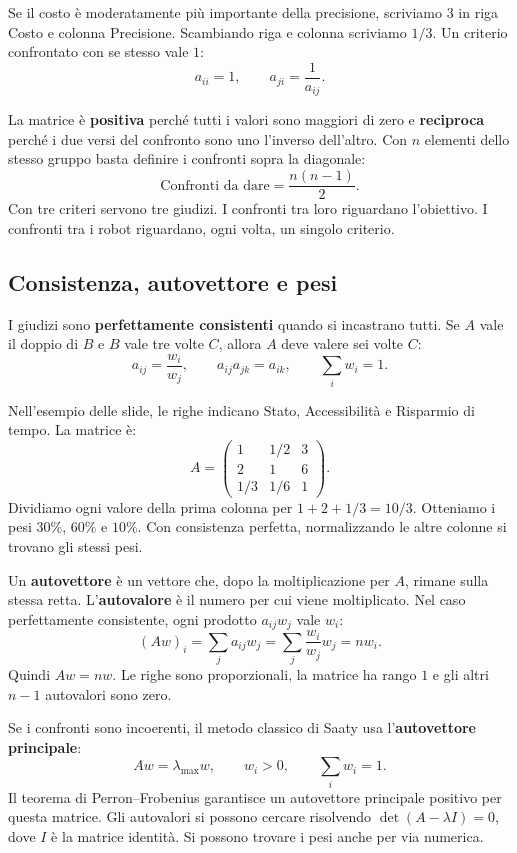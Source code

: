 \noindent Se il costo è moderatamente più importante della precisione,
scriviamo $3$ in riga Costo e colonna Precisione. Scambiando riga e
colonna scriviamo $1/3$. Un criterio confrontato con se stesso vale $1$:
\[
    a_{ii}=1,\qquad a_{ji}=\frac{1}{a_{ij}}.
\]

\noindent La matrice è \textbf{positiva} perché tutti i valori sono
maggiori di zero e \textbf{reciproca} perché i due versi del confronto
sono uno l'inverso dell'altro. Con $n$ elementi dello stesso gruppo
basta definire i confronti sopra la diagonale:
\[
    \text{Confronti da dare}=\frac{n(n-1)}{2}.
\]
\noindent Con tre criteri servono tre giudizi. I confronti tra loro
riguardano l'obiettivo. I confronti tra i robot riguardano, ogni volta,
un singolo criterio.

\subsection*{Consistenza, autovettore e pesi}

\noindent I giudizi sono \textbf{perfettamente consistenti} quando
si incastrano tutti. Se $A$ vale il doppio di $B$ e $B$ vale tre
volte $C$, allora $A$ deve valere sei volte $C$:
\[
    a_{ij}=\frac{w_i}{w_j},
    \qquad a_{ij}a_{jk}=a_{ik},
    \qquad \sum_i w_i=1.
\]

\noindent Nell'esempio delle slide, le righe indicano Stato,
Accessibilità e Risparmio di tempo. La matrice è:
\[
    A=\begin{pmatrix}
        1 & 1/2 & 3\\
        2 & 1 & 6\\
        1/3 & 1/6 & 1
    \end{pmatrix}.
\]
\noindent Dividiamo ogni valore della prima colonna per
$1+2+1/3=10/3$. Otteniamo i pesi $30\%$, $60\%$ e $10\%$.
Con consistenza perfetta, normalizzando le altre colonne
si trovano gli stessi pesi.

\noindent Un \textbf{autovettore} è un vettore che, dopo la
moltiplicazione per $A$, rimane sulla stessa retta. L'\textbf{autovalore}
è il numero per cui viene moltiplicato. Nel caso perfettamente
consistente, ogni prodotto $a_{ij}w_j$ vale $w_i$:
\[
    (Aw)_i=\sum_j a_{ij}w_j
    =\sum_j\frac{w_i}{w_j}w_j=nw_i.
\]
\noindent Quindi $Aw=nw$. Le righe sono proporzionali, la matrice
ha rango $1$ e gli altri $n-1$ autovalori sono zero.

\noindent Se i confronti sono incoerenti, il metodo classico di
Saaty usa l'\textbf{autovettore principale}:
\[
    Aw=\lambda_{\max}w,\qquad w_i>0,\qquad \sum_i w_i=1.
\]
\noindent Il teorema di Perron--Frobenius garantisce un autovettore
principale positivo per questa matrice. Gli autovalori si possono
cercare risolvendo $\det(A-\lambda I)=0$, dove $I$ è la matrice
identità. Si possono trovare i pesi anche per via numerica.

